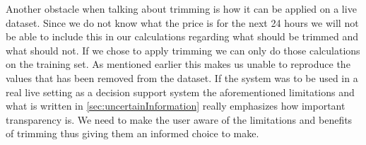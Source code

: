 Another obstacle when talking about trimming is how it can be applied on a live dataset. Since we do not know what the price is for the next 24 hours we will not be able to include this in our calculations regarding what should be trimmed and what should not. If we chose to apply trimming we can only do those calculations on the training set. As mentioned earlier this makes us unable to reproduce the values that has been removed from the dataset. If the system was to be used in a real live setting as a decision support system the aforementioned limitations and what is written in \ref{sec:uncertainInformation} really emphasizes how important transparency is. We need to make the user aware of the limitations and benefits of trimming thus giving them an informed choice to make.
